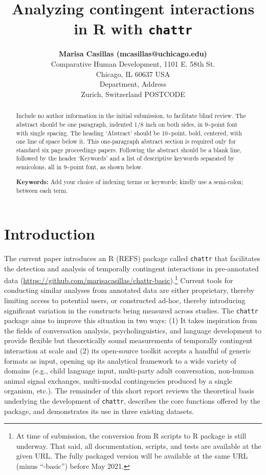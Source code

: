 \documentclass[10pt, letterpaper]{article}
\title{Analyzing contingent interactions in R with \texttt{chattr}}
\author{{\large \bf Marisa Casillas (mcasillas@uchicago.edu)} \\ Comparative Human Development, 1101 E. 58th St. \\ Chicago, IL 60637 USA \AND {\large \bf Camila Scaff (camiscaff@hotmail.com)} \\ Department, Address \\ Zurich, Switzerland POSTCODE}
\begin{document}
\maketitle

\begin{abstract}
Include no author information in the initial submission, to facilitate
blind review. The abstract should be one paragraph, indented 1/8 inch on
both sides, in 9\textasciitilde point font with single spacing. The
heading `Abstract' should be 10\textasciitilde point, bold, centered,
with one line of space below it. This one-paragraph abstract section is
required only for standard six page proceedings papers. Following the
abstract should be a blank line, followed by the header `Keywords' and a
list of descriptive keywords separated by semicolons, all in
9\textasciitilde point font, as shown below.

\textbf{Keywords:}
Add your choice of indexing terms or keywords; kindly use a semi-colon;
between each term.
\end{abstract}

\hypertarget{introduction}{%
\section{Introduction}\label{introduction}}

The current paper introduces an R (REFS) package called \texttt{chattr}
that facilitates the detection and analysis of temporally contingent
interactions in pre-annotated data
(\href{}{https://github.com/marisacasillas/chattr-basic}).\footnote{At
  time of submission, the conversion from R scripts to R package is
  still underway. That said, all documentation, scripts, and tests are
  available at the given URL. The fully packaged version will be
  available at the same URL (minus ``-basic'') before May 2021.} Current
tools for conducting similar analyses from annotated data are either
proprietary, thereby limiting access to potential users, or constructed
ad-hoc, thereby introducing significant variation in the constructs
being measured across studies. The \texttt{chattr} package aims to
improve this situation in two ways: (1) It takes inspiration from the
fields of conversation analysis, psycholinguistics, and language
development to provide flexible but theoretically sound measurements of
temporally contingent interaction at scale and (2) its open-source
toolkit accepts a handful of generic formats as input, opening up its
analytical framework to a wide variety of domains (e.g., child language
input, multi-party adult conversation, non-human animal signal
exchanges, multi-modal contingencies produced by a single organism,
etc.). The remainder of this short report reviews the theoretical basis
underlying the development of \texttt{chattr}, describes the core
functions offered by the package, and demonstrates its use in three
existing datasets.
\end{document}
